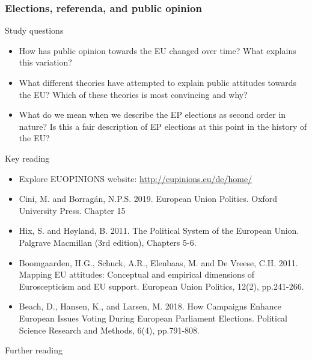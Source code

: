 \subsubsection*{Elections, referenda, and public opinion}

Study questions

\begin{itemize}
	\item How has public opinion towards the EU changed over time? What explains this variation?
	\item What different theories have attempted to explain public attitudes towards the EU? Which of these theories is most convincing and why?
	\item What do we mean when we describe the EP elections as second order in nature? Is this a fair description of EP elections at this point in the history of the EU?
\end{itemize}
	
\noindent Key reading
	
\begin{itemize}
	\item Explore EUOPINIONS website: \url{http://eupinions.eu/de/home/}
	\item Cini, M. and Borragán, N.P.S. 2019. European Union Politics. Oxford University Press. Chapter 15
	\item Hix, S. and H\o yland, B. 2011. The Political System of the European Union. Palgrave Macmillan (3rd edition), Chapters 5-6.
	\item Boomgaarden, H.G., Schuck, A.R., Elenbaas, M. and De Vreese, C.H. 2011. Mapping EU attitudes: Conceptual and empirical dimensions of Euroscepticism and EU support. European Union Politics, 12(2), pp.241-266.
	\item Beach, D., Hansen, K., and Larsen, M. 2018. How Campaigns Enhance European Issues Voting During European Parliament Elections. Political Science Research and Methods, 6(4), pp.791-808.
\end{itemize}

\noindent Further reading
	
